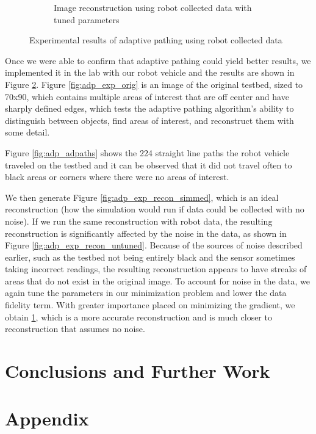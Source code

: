 \documentclass[english]{article}\usepackage[]{graphicx}\usepackage[]{color}
\begin{document}
\begin{figure}
\begin{subfigure}{.3\textwidth}
  \caption{Image reconstruction using robot collected data with tuned parameters}
  \vspace{0pt}
  \label{fig:adp_exp_recon_tuned}
\end{subfigure}
\caption{Experimental results of adaptive pathing using robot collected data}
\label{fig:adp_exp_fig}
\end{figure}
Once we were able to confirm that adaptive pathing could yield better results, we implemented it in the lab with our robot vehicle and the results are shown in Figure \ref{fig:adp_exp_fig}. Figure \ref{fig:adp_exp_orig} is an image of the original testbed, sized to 70x90, which contains multiple areas of interest that are off center and have sharply defined edges, which tests the adaptive pathing algorithm's ability to distinguish between objects, find areas of interest, and reconstruct them with some detail. 

Figure \ref{fig:adp_adpaths} shows the 224 straight line paths the robot vehicle traveled on the testbed and it can be observed that it did not travel often to black areas or corners where there were no areas of interest.

We then generate Figure \ref{fig:adp_exp_recon_simmed}, which is an ideal reconstruction (how the simulation would run if data could be collected with no noise). If we run the same reconstruction with robot data, the resulting reconstruction is significantly affected by the noise in the data, as shown in Figure \ref{fig:adp_exp_recon_untuned}. Because of the sources of noise described earlier, such as the testbed not being entirely black and the sensor sometimes taking incorrect readings, the resulting reconstruction appears to have streaks of areas that do not exist in the original image. To account for noise in the data, we again tune the parameters in our minimization problem and lower the data fidelity term. With greater importance placed on minimizing the gradient, we obtain \ref{fig:adp_exp_recon_tuned}, which is a more accurate reconstruction and is much closer to reconstruction that assumes no noise.
\section{Conclusions and Further Work}

\newpage




\newpage
\section{Appendix}
\end{document}
